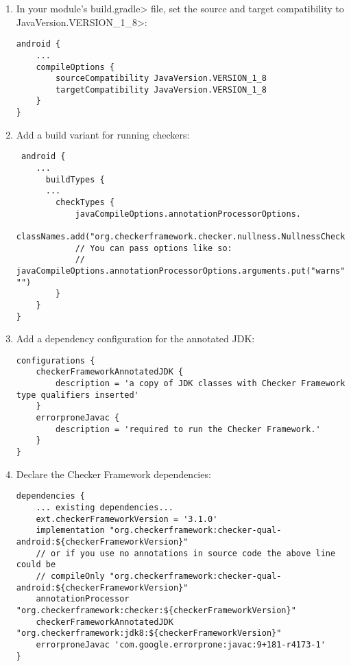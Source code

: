 \begin{enumerate}

\item In your module's \<build.gradle> file, set the source and target
  compatibility to \<JavaVersion.VERSION\_1\_8>:

\begin{Verbatim}
android {
    ...
    compileOptions {
        sourceCompatibility JavaVersion.VERSION_1_8
        targetCompatibility JavaVersion.VERSION_1_8
    }
}
\end{Verbatim}

\item Add a build variant for running checkers:

 \begin{Verbatim}
 android {
    ...
      buildTypes {
      ...
        checkTypes {
            javaCompileOptions.annotationProcessorOptions.
                    classNames.add("org.checkerframework.checker.nullness.NullnessChecker")
            // You can pass options like so:
            // javaCompileOptions.annotationProcessorOptions.arguments.put("warns", "")
        }
    }
}
\end{Verbatim}

\item Add a dependency configuration for the annotated JDK:

\begin{mysmall}
\begin{Verbatim}
configurations {
    checkerFrameworkAnnotatedJDK {
        description = 'a copy of JDK classes with Checker Framework type qualifiers inserted'
    }
    errorproneJavac {
        description = 'required to run the Checker Framework.'
    }
}

\end{Verbatim}
\end{mysmall}

\item Declare the Checker Framework dependencies:

\begin{mysmall}
\begin{Verbatim}
dependencies {
    ... existing dependencies...
    ext.checkerFrameworkVersion = '3.1.0'
    implementation "org.checkerframework:checker-qual-android:${checkerFrameworkVersion}"
    // or if you use no annotations in source code the above line could be
    // compileOnly "org.checkerframework:checker-qual-android:${checkerFrameworkVersion}"
    annotationProcessor "org.checkerframework:checker:${checkerFrameworkVersion}"
    checkerFrameworkAnnotatedJDK "org.checkerframework:jdk8:${checkerFrameworkVersion}"
    errorproneJavac 'com.google.errorprone:javac:9+181-r4173-1'
}
\end{Verbatim}
\end{mysmall}


\end{enumerate}
